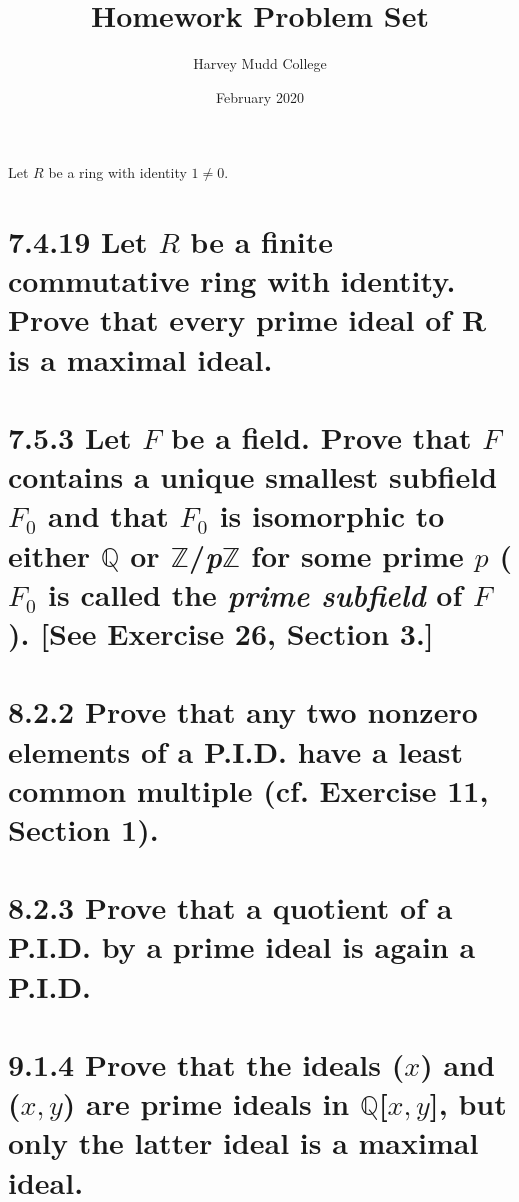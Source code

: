\documentclass{article}
\title{\textbf{Homework Problem Set \mypound 2}}
\author{Harvey Mudd College}
\date{February 2020}
\begin{document}
\maketitle

\large{} Let $R$ be a ring with identity $1\neq0.$

\section*{\hspace{-1.7cm}7.4.19\Large{} \normalfont Let $R$ be a finite commutative ring with identity. Prove that every prime ideal of R is a maximal ideal.}

\newpage

\section*{\hspace{-1.7cm}7.5.3\Large{} \normalfont Let $F$ be a field. Prove that $F$ contains a unique smallest subfield $F_0$ and that $F_0$ is isomorphic to either $\mathbb{Q}$ or $\mathbb{Z}$/\textit{p}$\mathbb{Z}$ for some prime $p$ ($F_0$ is called the \textit{prime subfield} of $F$).
[See Exercise 26, Section 3.]}

\newpage

\section*{\hspace{-1.4cm}8.2.2\Large{} \normalfont Prove that any two nonzero elements of a P.I.D. have a least common multiple (cf. Exercise 11, Section 1).}

\newpage

\section*{\hspace{-1.4cm}8.2.3\Large{} \normalfont Prove that a quotient of a P.I.D. by a prime ideal is again a P.I.D.}

\newpage

\section*{\hspace{-1.4cm}9.1.4\Large{} \normalfont Prove that the ideals ($x$) and ($x, y$) are prime ideals in $\mathbb{Q}$[$x, y$], but only the latter ideal is a maximal ideal.}
\end{document}
